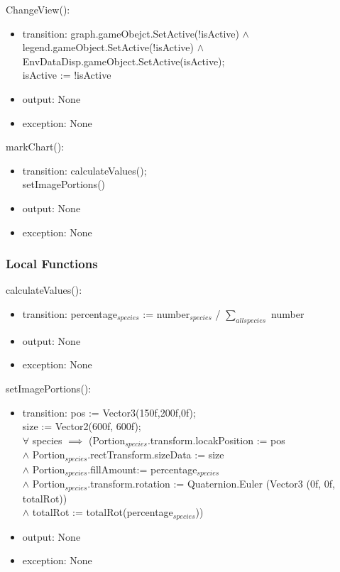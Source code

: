 \documentclass[12pt, titlepage]{article}
\begin{document}
\noindent ChangeView():
\begin{itemize}
\item transition: graph.gameObejct.SetActive(!isActive) $\land$ legend.gameObject.SetActive(!isActive) $\land$ EnvDataDisp.gameObject.SetActive(isActive);\\
isActive := !isActive
\item output: None
\item exception: None
\end{itemize}

\noindent markChart():
\begin{itemize}
\item transition: calculateValues();\\
setImagePortions()
\item output: None
\item exception: None
\end{itemize}



\subsubsection{Local Functions}
\noindent calculateValues():
\begin{itemize}
\item transition: percentage$_{species}$ := number$_{species}$ / $\sum_{all species}$ number
\item output: None
\item exception: None
\end{itemize}

\noindent setImagePortions():
\begin{itemize}
\item transition: pos := Vector3(150f,200f,0f);\\
size := Vector2(600f, 600f);\\
$\forall$ species $\implies$ (Portion$_{species}$.transform.locakPosition := pos \\
$\land$ Portion$_{species}$.rectTransform.sizeData := size \\
$\land$ Portion$_{species}$.fillAmount:= percentage$_{species}$ \\
$\land$ Portion$_{species}$.transform.rotation := Quaternion.Euler (Vector3 (0f, 0f, totalRot)) \\
$\land$ totalRot := totalRot(percentage$_{species}$))
\item output: None
\item exception: None
\end{itemize}
\end{document}
